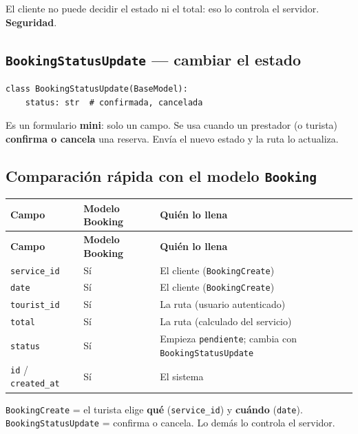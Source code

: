 \documentclass[11pt,a4paper]{article}
\begin{document}
El cliente no puede decidir el estado ni el total: eso lo controla el servidor. \textbf{Seguridad}.

\subsection{\texttt{BookingStatusUpdate} --- cambiar el estado}

\begin{lstlisting}
class BookingStatusUpdate(BaseModel):
    status: str  # confirmada, cancelada
\end{lstlisting}

Es un formulario \textbf{mini}: solo un campo. Se usa cuando un prestador (o turista)
\textbf{confirma o cancela} una reserva. Envía el nuevo estado y la ruta lo actualiza.

\subsection{Comparación rápida con el modelo \texttt{Booking}}

\begin{center}
{\small
\setlength{\tabcolsep}{4pt}
\begin{longtable}{@{}>{\raggedright\arraybackslash}p{3.4cm}>{\raggedright\arraybackslash}p{4.6cm}>{\raggedright\arraybackslash}p{6.9cm}@{}}
\toprule
\textbf{Campo} & \textbf{Modelo Booking} & \textbf{Quién lo llena} \\
\midrule
\endfirsthead
\toprule
\textbf{Campo} & \textbf{Modelo Booking} & \textbf{Quién lo llena} \\
\midrule
\endhead
\texttt{service\_id} & Sí & El cliente (\texttt{BookingCreate}) \\
\texttt{date} & Sí & El cliente (\texttt{BookingCreate}) \\
\texttt{tourist\_id} & Sí & La ruta (usuario autenticado) \\
\texttt{total} & Sí & La ruta (calculado del servicio) \\
\texttt{status} & Sí & Empieza \texttt{pendiente}; cambia con \texttt{BookingStatusUpdate} \\
\texttt{id} / \texttt{created\_at} & Sí & El sistema \\
\bottomrule
\end{longtable}
}
\end{center}

\begin{recuadro}
\texttt{BookingCreate} = el turista elige \textbf{qué} (\texttt{service\_id}) y \textbf{cuándo}
(\texttt{date}). \texttt{BookingStatusUpdate} = confirma o cancela. Lo demás lo controla el servidor.
\end{recuadro}
\end{document}
